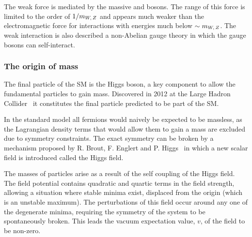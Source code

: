 The weak force is mediated by the massive \Wpm and \Z bosons. The range of this force is limited to the order of $1/m_{{W},\,{Z}}$ and appears much weaker than the electromagnetic force for interactions with energies much below $\sim m_{{W},\,{Z}}$. The weak interaction is also described a non-Abelian gauge theory in which the gauge bosons can self-interact. 



\subsubsection{The origin of mass}
The final particle of the SM is the Higgs boson, a key component to allow the fundamental particles to gain mass. Discovered in 2012 at the Large Hadron Collider~\cite{20121,201230} it constitutes the final particle predicted to be part of the SM. 

In the standard model all fermions would naively be expected to be massless, as the Lagrangian density terms that would allow them to gain a mass are excluded due to symmetry constraints. The exact symmetry can be broken by a mechanism proposed by R. Brout, F. Englert and P. Higgs~\cite{PhysRevLett.13.508,PhysRevLett.13.321} in which a new scalar field is introduced called the Higgs field. 

The masses of particles arise as a result of the self coupling of the Higgs field. The field potential contains quadratic and quartic terms in the field strength, allowing a situation where stable minima exist, displaced from the origin (which is an unstable maximum). The perturbations of this field occur around any one of the degenerate minima, requiring the symmetry of the system to be spontaneously broken. This leads the vacuum expectation value, $v$, of the field to be non-zero.   




